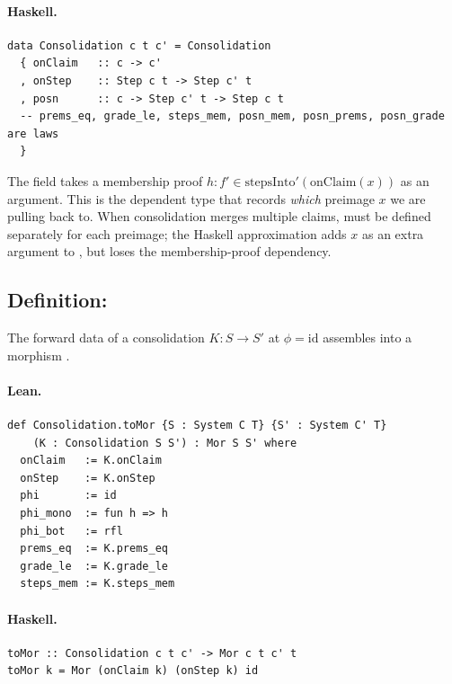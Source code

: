 \documentclass[11pt,a4paper]{article}
\begin{document}
\paragraph{Haskell.}
\begin{lstlisting}[style=haskell]
data Consolidation c t c' = Consolidation
  { onClaim   :: c -> c'
  , onStep    :: Step c t -> Step c' t
  , posn      :: c -> Step c' t -> Step c t
  -- prems_eq, grade_le, steps_mem, posn_mem, posn_prems, posn_grade are laws
  }
\end{lstlisting}

\begin{fidelitynote}
The  field takes a membership proof $h : f' \in
\mathrm{stepsInto}'(\mathrm{onClaim}(x))$ as an argument.  This is the
dependent type that records \emph{which} preimage $x$ we are pulling back to.
When consolidation merges multiple claims,  must be defined
separately for each preimage; the Haskell approximation adds $x$ as an extra
argument to , but loses the membership-proof dependency.
\end{fidelitynote}


\subsection{Definition: }

\begin{defn}
The forward data of a consolidation $K : S \to S'$ at $\phi = \mathrm{id}$
assembles into a morphism .
\end{defn}

\paragraph{Lean.}
\begin{lstlisting}[style=lean]
def Consolidation.toMor {S : System C T} {S' : System C' T}
    (K : Consolidation S S') : Mor S S' where
  onClaim   := K.onClaim
  onStep    := K.onStep
  phi       := id
  phi_mono  := fun h => h
  phi_bot   := rfl
  prems_eq  := K.prems_eq
  grade_le  := K.grade_le
  steps_mem := K.steps_mem
\end{lstlisting}

\paragraph{Haskell.}
\begin{lstlisting}[style=haskell]
toMor :: Consolidation c t c' -> Mor c t c' t
toMor k = Mor (onClaim k) (onStep k) id
\end{lstlisting}
\end{document}
